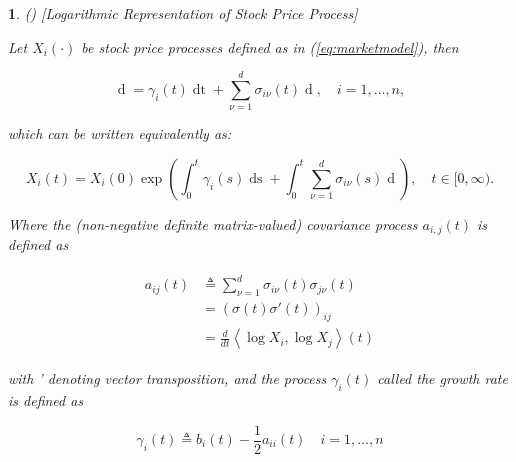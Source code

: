 \documentclass[british]{amsart}
\numberwithin{equation}{section}
\numberwithin{figure}{section}
\theoremstyle{plain}
\newtheorem{thm}{\protect\theoremname}[section]
\theoremstyle{definition}
\theoremstyle{plain}
\theoremstyle{plain}
\theoremstyle{plain}
\theoremstyle{remark}
\theoremstyle{plain}
\providecommand{\theoremname}{Theorem}
\renewcommand{\d}[1]{\mathop{\mathrm{d}{#1}}}
\newcommand{\ranget}{t\in[0,\infty)}
\newcommand{\defeq}{\mathop{\triangleq}}
\newcommand{\rangei}{i=1,\dots,n}
\begin{document}
\begin{thm} (\cite{fernholz1999pgf}) [Logarithmic Representation of Stock Price Process]
	\label{thm:logarithmicrepresentation}

	Let $X_{i}(\cdot)$ be stock price processes defined as in (\ref{eq:marketmodel}), then 

	\begin{equation} 
		\d{\log{X_{i}(t)}} = 
			\gamma_{i}(t)\d{t} + 
			\sum_{\nu=1}^{d} \sigma_{i\nu}(t){\d{W_{\nu}(t)}}, 
		\quad \rangei,
	\end{equation}

	which can be written equivalently as:

	\begin{equation*}
		X_{i}(t) = X_{i}(0) 
				\exp{ 
					\left(
						\int_{0}^{t} \gamma_{i}(s)\d{s} + \int_{0}^{t} 
						\sum_{\nu=1}^{d} \sigma_{i\nu}(s){\d{W_{\nu}(s)}} 
					\right)
				}, 
		\quad \ranget.
	\end{equation*}

	Where the (non-negative definite matrix-valued) \textit{covariance process} 
	$a_{i,j}(t)$ is defined as
	
	\begin{gather}
		\label{eq:covarianceprocess}
		\begin{split}
			a_{ij}(t)  
				& \defeq \sum_{\nu=1}^{d}\sigma_{i\nu}(t)\sigma_{j\nu}(t) \\ 
				& = \left( \sigma(t)\sigma'(t) \right)_{ij} \\
				& = \frac{d}{dt}\left\langle \log X_{i},\log X_{j}\right\rangle(t)
		\end{split}
	\end{gather}

	with ' denoting vector transposition, and the process $\gamma_{i}(t)$ called 
	the \textit{growth rate} is	defined as

	\begin{equation}
		\label{eq:gamma}
		\gamma_{i}(t)\defeq b_{i}(t)-\frac{1}{2}a_{ii}(t)
		\quad \rangei
	\end{equation}

\end{thm}
\end{document}
